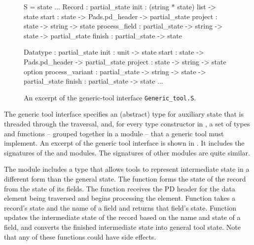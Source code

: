 \begin{figure}
\begin{code}\scriptsize
{}  S = 
   state
  ...
   Record : 
     partial_state
      init          : (string * state) list -> state
      start         : state -> Pads.pd_header 
                         -> partial_state
      project       : state -> string -> state
      process_field : partial_state -> string
                         -> state -> partial_state
      finish        : partial_state -> state

   Datatype : 
     partial_state
      init            : unit -> state
      start           : state -> Pads.pd_header 
                           -> partial_state
      project         : state -> string -> state option
      process_variant : partial_state -> string 
                           -> state -> partial_state
      finish          : partial_state -> state
   ...
\end{code}
\caption{An excerpt of the generic-tool interface \texttt{Generic\_tool.S}.}
\label{fig:gentool-interface}
\end{figure}


The generic tool interface specifies an (abstract) type for auxiliary
state that is threaded through the traversal, and, for every type
constructor in \padsml{}, a set of types and functions -- grouped
together in a module -- that a generic tool must implement. 
An excerpt of the generic tool interface is shown in
. It includes the signatures of the
 and  modules. The signatures of other modules
are quite similar.

The  module includes a type  that allows
tools to represent intermediate state in a different form than the
general state. The  function forms the state of the record
from the state of its fields. The  function receives the PD
header for the data element being traversed and begins processing the
element. Function  takes a record's state and the name of
a field and returns that field's state. Function 
updates the intermediate state of the record based on the name and
state of a field, and  converts the finished intermediate
state into general tool state.  Note that any of these functions could
have side effects.

